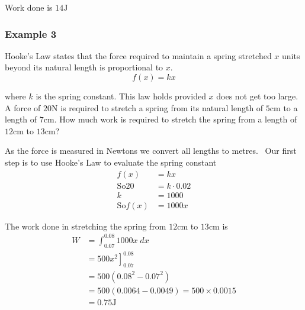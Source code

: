 Work done is $14 \mbox{J}$ 

\subsubsection{Example 3}
Hooke's Law states that the force required to maintain a spring stretched $x$ units beyond its natural length is proportional to $x$.
\begin{equation*}f (x) =k x
\end{equation*}

where $k$ is the spring constant. This law holds provided $x$ does not get too large. A force of $20 \mbox{N}$ is required to stretch a spring from its natural length of $5 \mbox{cm}$ to a length of $7 \mbox{cm}$. How much work is required to stretch the spring
from a length of $12 \mbox{cm}$ to $13 \mbox{cm}$? 

As the force is measured in Newtons we convert all lengths to metres.
\ Our first step is to use Hooke's Law to evaluate the spring constant
\begin{align*}f (x) &  = k x \\
\text{So}20 &  = k \cdot 0.02 \\
k &  = 1000 \\
\text{So}f (x) &  = 1000 x\end{align*}

The work done in stretching the spring from $12 \mbox{cm}$ to $13 \mbox{cm}$ is
\begin{align*}W &  = \int _{0.07}^{0.08}1000 x\; d x \\
 &  = \left .500 x^{2}\right ]_{0.07}^{0.08} \\
 &  = 500 \left (0.08^{2} -0.07^{2}\right ) \\
 &  = 500 \left (0.0064 -0.0049\right ) =500 \times 0.0015 \\
 &  = 0.75\text{}\mbox{J}\end{align*}

